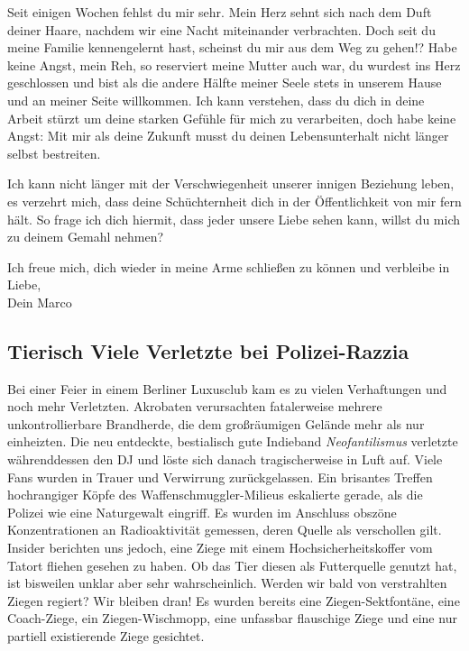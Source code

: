 \documentclass[final]{multiversum}
\begin{document}
Seit einigen Wochen fehlst du mir sehr. Mein Herz sehnt sich nach dem Duft
deiner Haare, nachdem wir eine Nacht miteinander verbrachten. Doch seit du meine
Familie kennengelernt hast, scheinst du mir aus dem Weg zu gehen!?  Habe keine
Angst, mein Reh, so reserviert meine Mutter auch war, du wurdest ins Herz
geschlossen und bist als die andere Hälfte meiner Seele stets in unserem Hause
und an meiner Seite willkommen. Ich kann verstehen, dass du dich in deine
Arbeit stürzt um deine starken Gefühle für mich zu verarbeiten, doch habe
keine Angst: Mit mir als deine Zukunft musst du deinen Lebensunterhalt nicht
länger selbst bestreiten.

Ich kann nicht länger mit der Verschwiegenheit unserer innigen Beziehung leben,
es verzehrt mich, dass deine Schüchternheit dich in der Öffentlichkeit von mir
fern hält.  So frage ich dich hiermit, dass jeder unsere Liebe sehen kann,
willst du mich zu deinem Gemahl nehmen?

Ich freue mich, dich wieder in meine Arme schließen zu können und verbleibe
in Liebe,\\
Dein Marco 

\subsection{Tierisch Viele Verletzte bei Polizei-Razzia}

Bei einer Feier in einem Berliner Luxusclub kam es zu vielen Verhaftungen und
noch mehr Verletzten. Akrobaten verursachten fatalerweise mehrere
unkontrollierbare Brandherde, die dem großräumigen Gelände mehr als nur
einheizten. Die neu entdeckte, bestialisch gute Indieband \emph{Neofantilismus}
verletzte währenddessen den DJ und löste sich danach tragischerweise in Luft
auf. Viele Fans wurden in Trauer und Verwirrung zurückgelassen. Ein brisantes
Treffen hochrangiger Köpfe des Waffenschmuggler-Milieus eskalierte gerade, als
die Polizei wie eine Naturgewalt eingriff. Es wurden im Anschluss obszöne
Konzentrationen an Radioaktivität gemessen, deren Quelle als verschollen gilt.
Insider berichten uns jedoch, eine Ziege mit einem Hochsicherheitskoffer vom
Tatort fliehen gesehen zu haben. Ob das Tier diesen als Futterquelle genutzt
hat, ist bisweilen unklar aber sehr wahrscheinlich. Werden wir bald von
verstrahlten Ziegen regiert? Wir bleiben dran! Es wurden bereits eine
Ziegen-Sektfontäne, eine Coach-Ziege, ein Ziegen-Wischmopp, eine unfassbar
flauschige Ziege und eine nur partiell existierende Ziege gesichtet.
\end{document}
